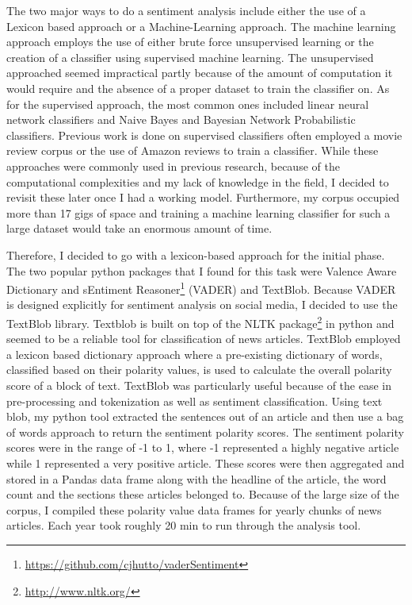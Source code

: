 \documentclass{acm_proc_article-sp}
\begin{document}
The two major ways to do a sentiment analysis include either the use of a Lexicon based approach or a Machine-Learning approach. The machine learning approach employs the use of either brute force unsupervised learning or the creation of a classifier using supervised machine learning. The unsupervised approached seemed impractical partly because of the amount of computation it would require and the absence of a proper dataset to train the classifier on. As for the supervised approach, the most common ones included linear neural network classifiers and Naive Bayes and Bayesian Network Probabilistic classifiers. Previous work is done on supervised classifiers often employed a movie review corpus or the use of Amazon reviews to train a classifier. While these approaches were commonly used in previous research, because of the computational complexities and my lack of knowledge in the field, I decided to revisit these later once I had a working model.  Furthermore, my corpus occupied more than 17 gigs of space and training a machine learning classifier for such a large dataset would take an enormous amount of time.

Therefore, I decided to go with a lexicon-based approach for the initial phase. The two popular python packages that I found for this task were Valence Aware Dictionary and sEntiment Reasoner\footnote{\url{https://github.com/cjhutto/vaderSentiment}} (VADER) and TextBlob. Because VADER is designed explicitly for sentiment analysis on social media, I decided to use the TextBlob library. Textblob is built on top of the NLTK package\footnote{\url{http://www.nltk.org/}} in python and seemed to be a reliable tool for classification of news articles. TextBlob employed a lexicon based dictionary approach where a pre-existing dictionary of words, classified based on their polarity values, is used to calculate the overall polarity score of a block of text. TextBlob was particularly useful because of the ease in pre-processing and tokenization as well as sentiment classification. Using text blob, my python tool extracted the sentences out of an article and then use a bag of words approach to return the sentiment polarity scores. The sentiment polarity scores were in the range of -1 to 1, where -1 represented a highly negative article while 1 represented a very positive article. These scores were then aggregated and stored in a Pandas data frame along with the headline of the article, the word count and the sections these articles belonged to. Because of the large size of the corpus, I compiled these polarity value data frames for yearly chunks of news articles. Each year took roughly 20 min to run through the analysis tool.
\end{document}
